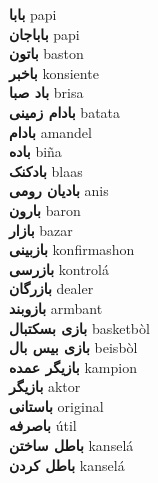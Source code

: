 \textbf{ بابا  } papi \\
\textbf{ باباجان  } papi \\
\textbf{ باتون  } baston \\
\textbf{ باخبر  } konsiente \\
\textbf{ باد صبا  } brisa \\
\textbf{ بادام زمینی  } batata \\
\textbf{ بادام  } amandel \\
\textbf{ باده  } biña \\
\textbf{ بادکنک  } blaas \\
\textbf{ بادیان رومی  } anis \\
\textbf{ بارون  } baron \\
\textbf{ بازار  } bazar \\
\textbf{ بازبینی  } konfirmashon \\
\textbf{ بازرسی  } kontrolá \\
\textbf{ بازرگان  } dealer \\
\textbf{ بازوبند  } armbant \\
\textbf{ بازی بسکتبال  } basketbòl \\
\textbf{ بازی بیس بال  } beisbòl \\
\textbf{ بازیگر عمده  } kampion \\
\textbf{ بازیگر  } aktor \\
\textbf{ باستانی  } original \\
\textbf{ باصرفه  } útil \\
\textbf{ باطل ساختن  } kanselá \\
\textbf{ باطل کردن  } kanselá \\
